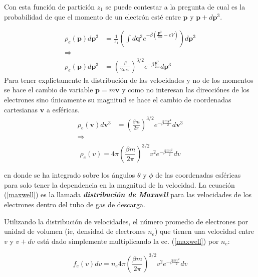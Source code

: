 \documentclass[letterpaper,12pt]{article}
\begin{document}
Con esta función de partición $z_1$ se puede contestar a la pregunta de cual es la probabilidad de que el momento  de un electrón esté entre $\mathbf{p}$ y $\mathbf{p}+d\mathbf{p}^3$. 

\begin{equation*}
\begin{split}
\rho_e (\mathbf{p})d\mathbf{p}^3&=\frac{1}{z_1}\left (\int d\mathbf{q}^3 e^{-\beta(\frac{\mathbf{p}^2}{2m}-eV)}\right) d\mathbf{p}^3\\
\Rightarrow\\
\rho_e (\mathbf{p})d\mathbf{p}^3&= \left( \frac{\beta}{2m\pi} \right) ^{3/2}e^{-\beta\frac{\mathbf{p^2}}{2m}}d\mathbf{p}^3
\end{split}
\end{equation*}
Para tener explictamente la distribución de las velocidades y no de los momentos se hace el cambio de variable $\mathbf{p}=m\mathbf{v}$ y como no interesan las direcciónes de los electrones sino únicamente su magnitud se hace el cambio de coordenadas cartesianas $\mathbf{v}$ a esféricas.
\begin{equation}\label{maxcart}
\begin{split}
\rho_e(\mathbf{v})d\mathbf{v}^3&= \left( \frac{\beta m}{2\pi} \right) ^{3/2}e^{-\beta\frac{m\mathbf{v^2}}{2}}d\mathbf{v}^3\\
\Rightarrow \\
\end{split}
\end{equation}
\begin{equation}\label{maxwell}
\rho_e(v)=4\pi\left(\frac{\beta m}{2\pi}\right)^{3/2}v^2e^{-\beta \frac{mv^2}{2}}dv
\end{equation}

en donde se ha integrado sobre los ángulos $\theta$ y $\phi$ de las coordenadas esféricas para solo tener la dependencia en la magnitud de la velocidad. La ecuación (\ref{maxwell}) es la llamada \textbf{\textit{distribución de Maxwell}} para las velocidades de los electrones dentro del tubo de gas de descarga. 

Utilizando la distribución de velocidades, el número promedio de electrones por unidad de volumen (ie, densidad de electrones $n_e$) que tienen una velocidad entre $v$ y $v+dv$ está dado simplemente multiplicando la ec. (\ref{maxwell}) por $n_e$:

\begin{equation}
f_e(v)dv=n_e4\pi\left(\frac{\beta m}{2\pi}\right)^{3/2}v^2e^{-\beta \frac{mv^2}{2}}dv
\end{equation}
\end{document}
